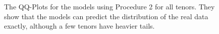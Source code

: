 \begin{figure}[!htbp]
\begin{subfigure}{0.49\textwidth}
        \label{fig:qq spline model p 2}
    \end{subfigure}
    \caption[The QQ-Plots for the models using Procedure 2 for all tenors.]{The QQ-Plots for the models using Procedure 2 for all tenors. They show that the models can predict the distribution of the real data exactly, although a few tenors have heavier tails.}
    \label{fig:qq p 2}
\end{figure}

